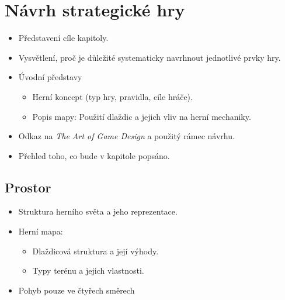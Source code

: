 \section{Návrh strategické hry}

\begin{itemize}
    \item Představení cíle kapitoly.
    \item Vysvětlení, proč je důležité systematicky navrhnout jednotlivé prvky hry.
    \item Úvodní představy
    \begin{itemize}
        \item Herní koncept (typ hry, pravidla, cíle hráče).
        \item Popis mapy: Použití dlaždic a jejich vliv na herní mechaniky.
    \end{itemize}
    \item Odkaz na \textit{The Art of Game Design} a použitý rámec návrhu.
    \item Přehled toho, co bude v kapitole popsáno.
\end{itemize}

\subsection{Prostor}
\begin{itemize}
    \item Struktura herního světa a jeho reprezentace.
    \item Herní mapa:
    \begin{itemize}
        \item Dlaždicová struktura a její výhody.
        \item Typy terénu a jejich vlastnosti.
    \end{itemize}
    \item Pohyb pouze ve čtyřech směrech
\end{itemize}

